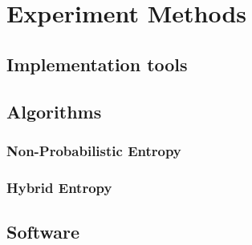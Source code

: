 \chapter{Experiment Methods}





\section{Implementation tools}

\section{Algorithms}

\subsection{Non-Probabilistic Entropy}

\subsection{Hybrid Entropy}

\section{Software}

